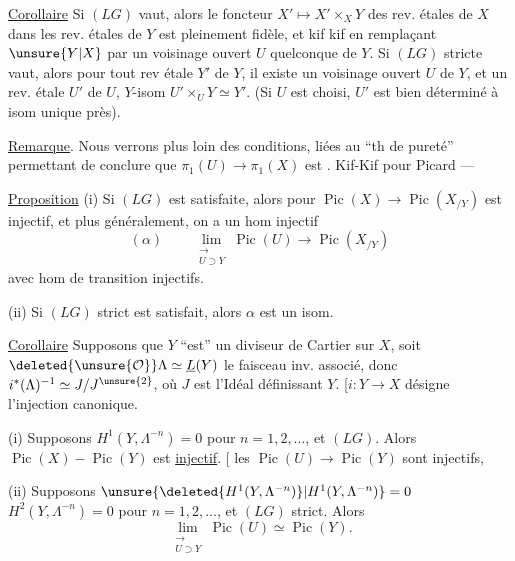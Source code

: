 \uline{Corollaire} Si $(LG)$ vaut, alors le foncteur
$X'\longmapsto X'\times_XY$ des rev. étales de $X$ dans les
rev. étales de $Y$ est pleinement fidèle,
et kif kif en remplaçant $\unsure{Y|X}$ par un voisinage
ouvert $U$ quelconque de $Y$.
Si $(LG)$ stricte vaut, alors pour tout rev étale $Y'$ de $Y$,
il existe un 
voisinage ouvert $U$ de $Y$, et un rev. étale $U'$ de $U$,
 
$Y$-isom $U'\times_UY\simeq Y'$.
(Si $U$ est choisi, $U'$ est bien déterminé à isom unique près).

\uline{Remarque}. Nous verrons plus loin des conditions,
liées au ``th de pureté'' permettant de conclure que
$\pi_1(U)\longrightarrow\pi_1(X)$ est
.
Kif-Kif pour Picard ---


\uline{Proposition} (i) Si $(LG)$ est satisfaite, alors pour
$\operatorname{Pic}(X)\longrightarrow\operatorname{Pic}(X_{/Y})$
est injectif, et plus généralement, on a un hom injectif
\[
(\alpha)\qquad
\mathop{\mathrm{lim}}_{\substack{\longrightarrow\\U\supset Y}}
\operatorname{Pic}(U)\longrightarrow\operatorname{Pic}(X_{/Y})
\]
avec hom de transition injectifs.

(ii) Si $(LG)$ strict est satisfait, alors $\alpha$ est un isom.

\uline{Corollaire} Supposons que $Y$ ``est'' un diviseur de
Cartier sur $X$, soit $\deleted{\unsure{\mathcal O}}\Lambda\simeq
\underline L(Y)$ le faisceau inv. associé, donc
$i^*(\Lambda)^{-1}\simeq J/J^{\unsure{2}}$,
où $J$ est l'Idéal définissant $Y$.
[$i:Y\longrightarrow X$ désigne l'injection canonique.


(i) Supposons $H^1(Y,\Lambda^{-n})=0$ pour $n=1,2,\ldots$,
et $(LG)$. Alors $\operatorname{Pic}(X)\mathbin{-}\operatorname{Pic}(Y)$
est \uline{injectif}.
[ 
les $\operatorname{Pic}(U)\longrightarrow\operatorname{Pic}(Y)$
sont injectifs,  

(ii) Supposons
$\unsure{\deleted{H^1(Y,\Lambda^{-n})}|H^1(Y,\Lambda^{-n})}=0$
 $H^2(Y,\Lambda^{-n})=0$ pour $n=1,2,\ldots$,
et $(LG)$ strict.
Alors
\[
\mathop{\mathrm{lim}}_{\substack{\longrightarrow\\U\supset Y}}
\operatorname{Pic}(U)\simeq\operatorname{Pic}(Y).
\]

